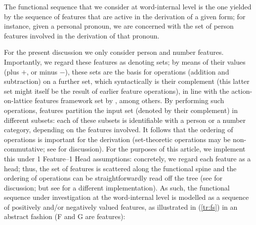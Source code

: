 \documentclass[output=paper]{langscibook}
\begin{document}
The functional sequence that we consider at word-internal level is the one yielded by the sequence of features that are active in the derivation of a given form; for instance, given a personal pronoun, we are concerned with the set of person features involved in the derivation of that pronoun. 

For the present discussion we only consider person and number features. Importantly, we regard these features as denoting sets; by means of their values (plus $+$, or minus $-$), these sets are the basis for operations (addition and subtraction) on a further set, which syntactically is their complement (this latter set might itself be the result of earlier feature operations), in line with the action-on-lattice features framework set by \citet{Harbour2008, Harbour2011, Harbour2016}, among others. By performing such operations, features partition the input set (denoted by their complement) in different subsets: each of these subsets is identifiable with a person or a number category, depending on the features involved. It follows that the ordering of operations is important for the derivation (set-theoretic operations may be non-commutative; see \citealt[66]{Harbour2016} for discussion). For the purposes of this article, we implement this under 1 Feature--1 Head assumptions: concretely, we regard each feature as a head; thus, the set of features is scattered along the functional spine and the ordering of operations can be straightforwardly read off the tree (see \citealt[92--93]{Terenghi2023} for discussion; 
but see \citealt{Harbour2016} for a different implementation). 
As such, the functional sequence under investigation at the word-internal level is modelled as a sequence of positively and/or negatively valued features, as illustrated in (\ref{tr:fs}) in an abstract fashion (F and G are features):
\end{document}
